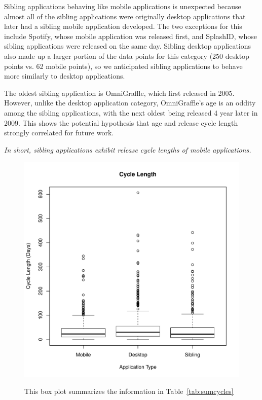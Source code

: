 \documentclass{acm_proc_article-sp}
\begin{document}
Sibling applications behaving like mobile applications is unexpected because almost all of the sibling applications were originally desktop applications that later had a sibling mobile application developed.
The two exceptions for this include Spotify, whose mobile application was released first, and SplashID, whose sibling applications were released on the same day.
Sibling desktop applications also made up a larger portion of the data points for this category (250 desktop points vs. 62 mobile points), so we anticipated sibling applications to behave more similarly to desktop applications.

The oldest sibling application is OmniGraffle, which first released in 2005.
However, unlike the desktop application category, OmniGraffle's age is an oddity among the sibling applications, with the next oldest being released 4 year later in 2009. 
This shows the potential hypothesis that age and release cycle length strongly correlated for future work.

\textit{In short, sibling applications exhibit release cycle lengths of mobile applications.}

\begin{figure}
\begin{center}
\includegraphics[width=.5\textwidth]{CycleBoxPlot.pdf}
\label{fig:CycleBox}
\caption{This box plot summarizes the information in Table~\ref{tab:sumcycles}}
\end{center}
\end{figure}

\begin{center}

\label{tab:sumcycles}
\end{center}

\begin{center}

\label{tab:cycles}
\end{center}
\end{document}
